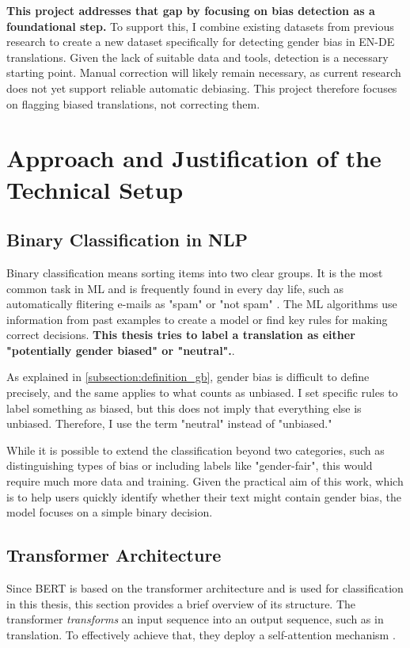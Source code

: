     \textbf{This project addresses that gap by focusing on bias detection as a foundational step.} To support this, I combine existing datasets from previous research to create a new dataset specifically for detecting gender bias in EN-DE translations. Given the lack of suitable data and tools, detection is a necessary starting point. Manual correction will likely remain necessary, as current research does not yet support reliable automatic debiasing. This project therefore focuses on flagging biased translations, not correcting them.


\section{Approach and Justification of the Technical Setup}

\subsection{Binary Classification in NLP}
Binary classification means sorting items into two clear groups. It is the most common task in ML and is frequently found in every day life, such as automatically flitering e-mails as "spam" or "not spam" \citep{quemyBinaryClassificationUnstructured2019}. The ML algorithms use information from past examples to create a model or find key rules for making correct decisions. \textbf{This thesis tries to label a translation as either "potentially gender biased" or "neutral".}. 

As explained in \autoref{subsection:definition_gb}, gender bias is difficult to define precisely, and the same applies to what counts as unbiased. I set specific rules to label something as biased, but this does not imply that everything else is unbiased. Therefore, I use the term "neutral" instead of "unbiased."

While it is possible to extend the classification beyond two categories, such as distinguishing types of bias or including labels like "gender-fair", this would require much more data and training. Given the practical aim of this work, which is to help users quickly identify whether their text might contain gender bias, the model focuses on a simple binary decision.


\subsection{Transformer Architecture} \label{subsection:transformer_arch}
Since BERT is based on the transformer architecture and is used for classification in this thesis, this section provides a brief overview of its structure. The transformer \textit{transforms} an input sequence into an output sequence, such as in translation. To effectively achieve that, they deploy a self-attention mechanism \citep{phuongFormalAlgorithmsTransformers2022}.


